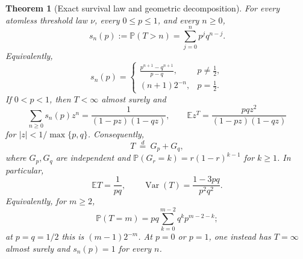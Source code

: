 \documentclass[11pt,a4paper]{amsart}
\newtheorem{theorem}{Theorem}[section]
\theoremstyle{definition}
\theoremstyle{remark}
\newcommand{\Prob}{\mathbb P}
\newcommand{\Exp}{\mathbb E}
\begin{document}
\begin{theorem}[Exact survival law and geometric decomposition]
\label{thm:law}
For every atomless threshold law $\nu$, every $0\leq p\leq1$, and every
$n\geq0$,
\begin{equation}\label{eq:survival}
 s_n(p):=\Prob(T>n)=\sum_{j=0}^n p^j q^{n-j}.
\end{equation}
Equivalently,
\begin{equation}\label{eq:survival-closed}
 s_n(p)=
 \begin{cases}
 \displaystyle\frac{p^{n+1}-q^{n+1}}{p-q},&p\neq\tfrac12,\\[6pt]
 (n+1)2^{-n},&p=\tfrac12.
 \end{cases}
\end{equation}
If $0<p<1$, then $T<\infty$ almost surely and
\begin{equation}\label{eq:gf}
 \sum_{n\geq0}s_n(p)z^n
   =\frac{1}{(1-pz)(1-qz)},\qquad
 \Exp z^T=\frac{pqz^2}{(1-pz)(1-qz)}
\end{equation}
for $|z|<1/\max\{p,q\}$.  Consequently,
\begin{equation}\label{eq:geom}
 T\ \overset{d}{=}\ G_p+G_q,
\end{equation}
where $G_p,G_q$ are independent and
$\Prob(G_r=k)=r(1-r)^{k-1}$ for $k\geq1$.  In particular,
\begin{equation}\label{eq:moments}
 \Exp T=\frac1{pq},\qquad
 \operatorname{Var}(T)=\frac{1-3pq}{p^2q^2}.
\end{equation}
Equivalently, for $m\geq2$,
\begin{equation}\label{eq:pmf}
 \Prob(T=m)=pq\sum_{k=0}^{m-2}q^kp^{m-2-k};
\end{equation}
at $p=q=1/2$ this is $(m-1)2^{-m}$.
At $p=0$ or $p=1$, one instead has $T=\infty$ almost surely and
$s_n(p)=1$ for every $n$.
\end{theorem}
\end{document}

